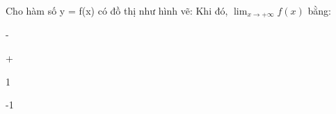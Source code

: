 \begin{question}[type=multiple_choice,difficulty=1,code={I-7}]
Cho hàm số y = f(x) có đồ thị như hình vẽ:
Khi đó, $ \lim_{x \to +\infty} f(x) $ bằng:



\begin{choice}[label=A]
-\infty
\end{choice}

\begin{choice}[label=B]
+\infty
\end{choice}

\begin{choice}[label=C]
1
\end{choice}

\begin{choice}[correct,label=D]
-1
\end{choice}

\end{question}